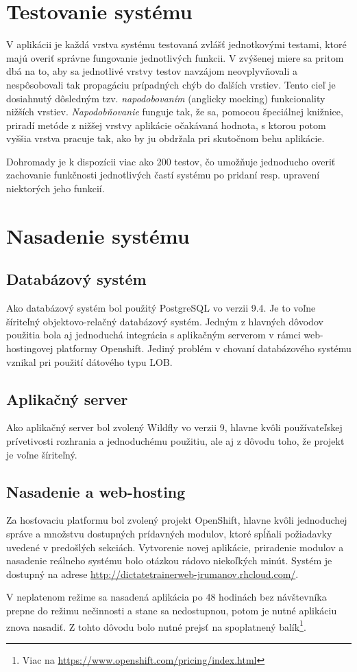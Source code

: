 \documentclass[12pt,oneside]{fithesis2}
\begin{document}
\chapter{Testovanie systému} \label{unit-testy}
	\par V aplikácii je každá vrstva systému testovaná zvlášť jednotkovými testami, ktoré majú overiť správne fungovanie jednotlivých funkcii. V zvýšenej miere sa pritom dbá na to, aby sa jednotlivé vrstvy testov navzájom neovplyvňovali a nespôsobovali tak propagáciu prípadných chýb do ďalších vrstiev. Tento cieľ je dosiahnutý dôsledným tzv. \textit{napodobovaním} (anglicky mocking) funkcionality nižších vrstiev. \textit{Napodobňovanie} funguje tak, že sa, pomocou špeciálnej knižnice, priradí metóde z nižšej vrstvy aplikácie očakávaná hodnota, s ktorou potom vyššia vrstva pracuje tak, ako by ju obdržala pri skutočnom behu aplikácie.
	\par Dohromady je k dispozícii viac ako 200 testov, čo umožňuje jednoducho overiť zachovanie funkčnosti jednotlivých častí systému po pridaní resp. upravení niektorých jeho funkcií.
\chapter{Nasadenie systému} \label{nasadenie}
	\section{Databázový systém}
      \par Ako databázový systém bol použitý PostgreSQL vo verzii 9.4. Je to voľne šíriteľný objektovo-relačný databázový systém\cite{postgre15}. Jedným z hlavných dôvodov použitia bola aj jednoduchá integrácia s aplikačným serverom v rámci web-hostingovej platformy Openshift. Jediný problém v chovaní databázového systému vznikal pri použití dátového typu LOB.
      \section{Aplikačný server}
      \par Ako aplikačný server bol zvolený Wildfly vo verzii 9, hlavne kvôli používateľskej prívetivosti rozhrania a jednoduchému použitiu, ale aj z dôvodu toho, že projekt je voľne šíriteľný.
      \section{Nasadenie a web-hosting}
      \par Za hosťovaciu platformu bol zvolený projekt OpenShift, hlavne kvôli jednoduchej správe a množstvu dostupných prídavných modulov, ktoré spĺňali požiadavky uvedené v predošlých sekciách. Vytvorenie novej aplikácie, priradenie modulov a nasadenie reálneho systému bolo otázkou rádovo niekoľkých minút. Systém je dostupný na adrese \url{http://dictatetrainerweb-jrumanov.rhcloud.com/}.
      \par V neplatenom režime sa nasadená aplikácia po 48 hodinách bez návštevníka prepne do režimu nečinnosti a stane sa nedostupnou, potom je nutné aplikáciu znova nasadiť. Z tohto dôvodu bolo nutné prejsť na spoplatnený balík\footnote{Viac na \url{https://www.openshift.com/pricing/index.html}}.
\end{document}
